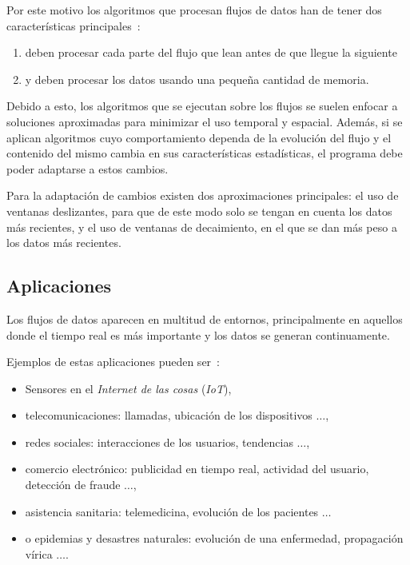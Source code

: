 Por este motivo los algoritmos que procesan flujos de datos han de tener dos características principales~\cite{bifet2018machine}:

\begin{enumerate}
	\item deben procesar cada parte del flujo que lean antes de que llegue la siguiente
	\item y deben procesar los datos usando una pequeña cantidad de memoria.
\end{enumerate}

Debido a esto, los algoritmos que se ejecutan sobre los flujos se suelen enfocar a soluciones aproximadas para minimizar el uso temporal y espacial. Además, si se aplican algoritmos cuyo comportamiento dependa de la evolución del flujo y el contenido del mismo cambia en sus características estadísticas, el programa debe poder adaptarse a estos cambios.

Para la adaptación de cambios existen dos aproximaciones principales: el uso de ventanas deslizantes, para que de este modo solo se tengan en cuenta los datos más recientes, y el uso de ventanas de decaimiento, en el que se dan más peso a los datos más recientes. 

\subsection{Aplicaciones}

Los flujos de datos aparecen en multitud de entornos, principalmente en aquellos donde el tiempo real es más importante y los datos se generan continuamente.

Ejemplos de estas aplicaciones pueden ser~\cite{rodriguez2020flujos}:
\begin{itemize}
	\item Sensores en el \textit{Internet de las cosas} (\textit{IoT}),
	\item telecomunicaciones: llamadas, ubicación de los dispositivos $\ldots$,
	\item redes sociales: interacciones de los usuarios, tendencias $\ldots$,
	\item comercio electrónico: publicidad en tiempo real, actividad del usuario, detección de fraude $\ldots$,
	\item asistencia sanitaria: telemedicina, evolución de los pacientes $\ldots$
	\item o epidemias y desastres naturales: evolución de una enfermedad, propagación vírica $\ldots$.
\end{itemize}




